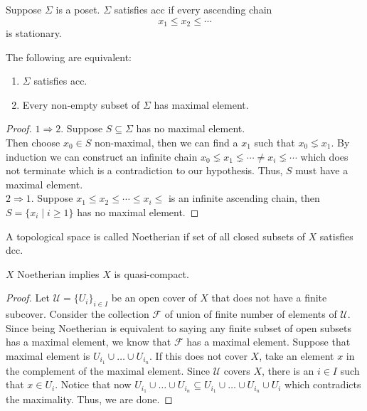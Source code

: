 \documentclass[oneside, 12pt, ]{scrbook}
\theoremstyle{theorem}
\begin{document}
Suppose $\Sigma$ is a poset. $\Sigma$ satisfies acc if every ascending chain $$x_{1} \le x_{2} \le \cdots $$ is stationary.

\begin{lemma}
The following are equivalent: 
\begin{enumerate}
\item $\Sigma$ satisfies acc. 
\item Every non-empty subset of $\Sigma$ has maximal element.
\end{enumerate}
\end{lemma}

\begin{proof}
$1 \Rightarrow 2$. Suppose $S \subseteq \Sigma$ has no maximal element. \\
Then choose $x_{0} \in S$ non-maximal, then we can find a $x_{1}$ such that $x_{0} \lneq x_{1}$. By induction we can construct an infinite chain $x_{0} \lneq x_{1} \lneq \cdots \neq x_{i} \lneq \cdots$ which does not terminate which is a contradiction to our hypothesis. Thus, $S$ must have a maximal element.\\
$2 \Rightarrow 1$. Suppose $x_{1} \le x_{2} \le \cdots \le x_{i} \le $ is an infinite ascending chain, then $S = \{x_{i}\mid i \geq 1\}$ has no maximal element. 
\end{proof}

\begin{definition}
A topological space is called Noetherian if set of all closed subsets of $X$ satisfies dcc.
\end{definition}

\begin{lemma}
$X$ Noetherian implies $X$ is quasi-compact.
\end{lemma}

\begin{proof}
Let $\mathcal{U}=\{U_{i}\}_{i \in I}$ be an open cover of $X$ that does not have a finite subcover. Consider the collection $\mathcal{F}$ of union of finite number of elements of $\mathcal{U}$. Since being Noetherian is equivalent to saying any finite subset of open subsets has a maximal element, we know that $\mathcal{F}$ has a maximal element. Suppose that maximal element is $U_{i_{1}} \cup \hdots \cup U_{i_{n}}$. If this does not cover $X$, take an element $x$ in the complement of the maximal element. Since $\mathcal{U}$ covers $X$, there is an $i \in I$ such that $x \in U_{i}$. Notice that now $U_{i_{1}} \cup \hdots \cup U_{i_{n}} \subseteq U_{i_{1}} \cup \hdots \cup U_{i_{n}} \cup U_{i}$ which contradicts the maximality. Thus, we are done.  
\end{proof}
\end{document}
